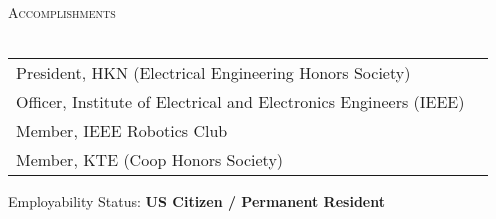 \documentclass[a4paper]{article}
\newcommand{\lineunder} {
    \vspace*{-8pt} \\
    \hspace*{-18pt} \hrulefill \\
}
\newcommand{\header} [1] {
    {\hspace*{-18pt}\vspace*{6pt} \textsc{#1}}
    \vspace*{-6pt} \lineunder
}
\begin{document}
\header{Accomplishments}
\begin{tabular}{ l l }
    President, HKN (Electrical Engineering Honors Society)\\
    Officer, Institute of Electrical and Electronics Engineers (IEEE)\\
    Member, IEEE Robotics Club\\
    Member, KTE (Coop Honors Society)\\
\end{tabular}
\vspace{2mm}

Employability Status: \textbf{US Citizen / Permanent Resident}\\

\ 
\end{document}

